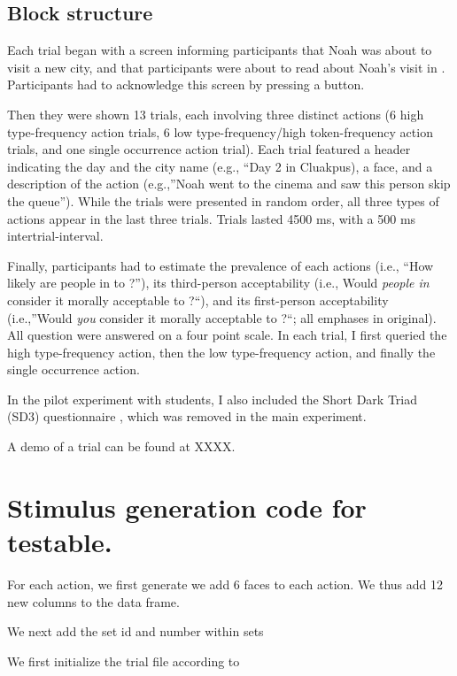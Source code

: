 \documentclass[
]{article}
\begin{document}
\subsection{Block structure}\label{block-structure}

Each trial began with a screen informing participants that Noah was
about to visit a new city, and that participants were about to read
about Noah's visit in . Participants had to acknowledge this screen by
pressing a button.

Then they were shown 13 trials, each involving three distinct actions (6
high type-frequency action trials, 6 low type-frequency/high
token-frequency action trials, and one single occurrence action trial).
Each trial featured a header indicating the day and the city name (e.g.,
``Day 2 in Cluakpus), a face, and a description of the action
(e.g.,''Noah went to the cinema and saw this person skip the queue'').
While the trials were presented in random order, all three types of
actions appear in the last three trials. Trials lasted 4500 ms, with a
500 ms intertrial-interval.

Finally, participants had to estimate the prevalence of each actions
(i.e., ``How likely are people in to \emph{}?''), its third-person
acceptability (i.e., Would \emph{people in } consider it morally
acceptable to \emph{}?``), and its first-person acceptability
(i.e.,''Would \emph{you} consider it morally acceptable to
\emph{}?{\kern0pt}``; all emphases in original). All question were
answered on a four point scale. In each trial, I first queried the high
type-frequency action, then the low type-frequency action, and finally
the single occurrence action.

In the pilot experiment with students, I also included the Short Dark
Triad (SD3) questionnaire \cite{Jones2014}, which was removed in the
main experiment.

A demo of a trial can be found at XXXX.

\section{Stimulus generation code for
testable.}\label{stimulus-generation-code-for-testable.}

For each action, we first generate we add 6 faces to each action. We
thus add 12 new columns to the data frame.

We next add the set id and number within sets

We first initialize the trial file according to
\end{document}
